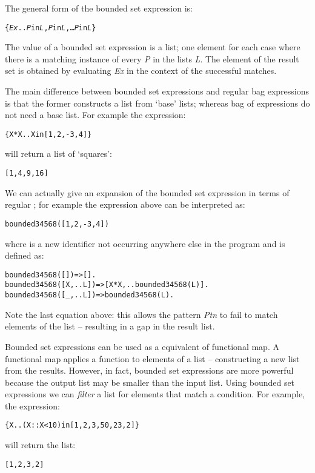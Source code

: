 The general form of the bounded set expression is:
\begin{alltt}
\{ \emph{Ex} .. \emph{P} in \emph{L}, \emph{P} in \emph{L}, \ldots{}\emph{P\subn} in \emph{L\subn}\}
\end{alltt}
The value of a bounded set expression is a list; one element for each case where there is a matching instance of every \emph{P\subi} in the lists \emph{L\subi}. The element of the result set is obtained by evaluating \emph{Ex} in the context of the successful matches.

The main difference between bounded set expressions and regular bag expressions is that the former constructs a list from `base' lists; whereas bag of expressions do not need a base list. For example the expression:
\begin{alltt}
\{ X*X .. X in [1,2,-3,4] \}
\end{alltt}
will return a list of `squares':
\begin{alltt}
[1,4,9,16]
\end{alltt}
We can actually give an expansion of the bounded set expression in terms of regular \go; for example the expression above can be interpreted as:
\begin{alltt}
bounded34568([1,2,-3,4])
\end{alltt}
where  is a new identifier not occurring anywhere else in the program and is defined as:
\begin{alltt}
bounded34568([]) => [].
bounded34568([X,..L]) => [X*X,.. bounded34568(L)].
bounded34568([_,..L]) => bounded34568(L).
\end{alltt}
Note the last  equation above: this allows the pattern \emph{Ptn} to fail to match elements of the list -- resulting in  a gap in the result list.

Bounded set expressions can be used as a \go equivalent of functional map. A functional map applies a function to elements of a list -- constructing a new list from the results. However, in fact, bounded set expressions are more powerful because the output list may be smaller than the input list. Using bounded set expressions we can \emph{filter} a list for elements that match a condition. For example, the expression:
\begin{alltt}
\{ X .. (X::X<10) in [1,2,3,50,23,2] \}
\end{alltt}
will return the list:
\begin{alltt}
[1,2,3,2]
\end{alltt}

